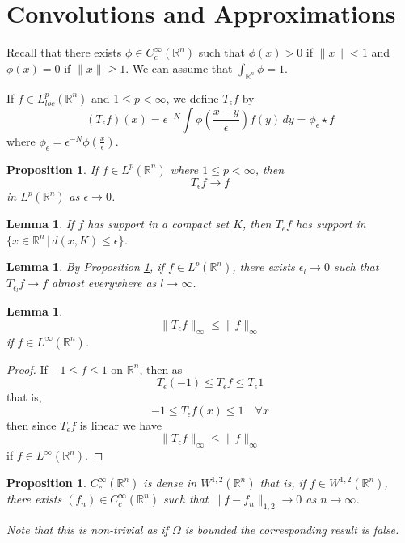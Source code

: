 \documentclass[10pt, oneside, reqno]{amsart}
\theoremstyle{plain}%
\newtheorem{lem}[thm]{Lemma}
\newtheorem{prop}[thm]{Proposition}
\numberwithin{equation}{section}
\theoremstyle{definition}
\theoremstyle{remark}
\newcommand{\given}{ \, | \,}
\newcommand{\R}{\mathbb{R}}
\begin{document}
\section{Convolutions and Approximations} %
\label{sec:convolutions_and_approximations}
Recall that there exists $\phi  \in C^\infty_c(\R^n)$ such that $\phi(x) > 0$ if $\| x \| < 1$ and $\phi(x) = 0$ if $\| x \| \geq 1$.  We can assume that $\int_{\R^n} \phi = 1$.

If $f \in L^p_{loc}(\R^n)$ and $1 \leq p < \infty$, we define $T_\epsilon f$ by \[
    (T_\epsilon f)(x) = \epsilon^{-N} \int \phi \left( \frac{x-y}{\epsilon} \right) f(y) \, dy = \phi_\epsilon \star f
\] where $\phi_\epsilon = \epsilon^{-N} \phi\left( \frac{x}{\epsilon}\right)$.


\begin{prop}
    \label{prop:convergence_of_covolution}
    If $f \in L^p(\R^n)$ where $1 \leq p < \infty$, then \[
        T_\epsilon f \rightarrow f
    \] in $L^p(\R^n)$ as $\epsilon \rightarrow 0$.  
\end{prop}  

\begin{lem}
    If $f$ has support in a compact set $K$, then $T_e f$ has support in $\{ x \in \R^n \given d(x, K) \leq \epsilon \}$. 
\end{lem}

\begin{lem}
    By Proposition \ref{prop:convergence_of_covolution}, if $f \in L^p(\R^n)$, there exists $\epsilon_l \rightarrow 0$ such that $T_{\epsilon_l} f \rightarrow f$ almost everywhere as $l \rightarrow \infty$.
\end{lem}

\begin{lem}
     \[
        \| T_\epsilon f \|_{\infty} \leq \| f \|_\infty
    \] if $f \in L^\infty(\R^n)$.
\end{lem}

\begin{proof}
    If $-1 \leq f \leq 1$ on $\R^n$, then as \[
        T_\epsilon(-1) \leq T_\epsilon f \leq T_\epsilon 1
    \] that is, \[
        -1 \leq T_\epsilon f(x) \leq 1 \quad \forall x
    \] then since $T_\epsilon f$ is linear we have \[
        \| T_\epsilon f \|_{\infty} \leq \| f \|_\infty
    \] if $f \in L^\infty(\R^n)$.
\end{proof}

\begin{prop}
    $C_c^\infty(\R^n)$ is dense in $W^{1, 2}(\R^n)$ that is, if $f \in W^{1, 2}(\R^n)$, there exists $(f_n) \in C^\infty_c(\R^n)$ such that $\| f - f_n \|_{1, 2} \rightarrow 0$ as $n \rightarrow \infty$. 
    
    Note that this is non-trivial as if $\Omega$ is bounded the corresponding result is false.
\end{prop}
\end{document}

